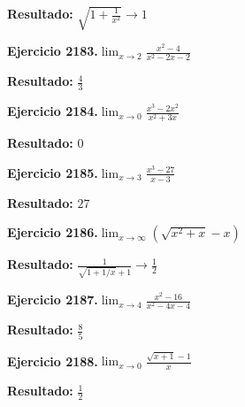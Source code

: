 \documentclass[10pt,a4paper]{article}
\begin{document}
\begin{solbox}
\textbf{Resultado:} \(\displaystyle \sqrt{1+\frac{1}{x^2}} \to 1\)
\end{solbox}

\newpage
\begin{ejbox}
\textbf{Ejercicio 2183.}\quad $\lim_{x\to 2} \frac{x^2-4}{x^2-2x-2}$
\end{ejbox}

\begin{solbox}
\textbf{Resultado:} \(\displaystyle \frac{4}{3}\)
\end{solbox}

\begin{ejbox}
\textbf{Ejercicio 2184.}\quad $\lim_{x\to 0} \frac{x^3-2x^2}{x^2+3x}$
\end{ejbox}

\begin{solbox}
\textbf{Resultado:} \(\displaystyle 0\)
\end{solbox}

\begin{ejbox}
\textbf{Ejercicio 2185.}\quad $\lim_{x\to 3} \frac{x^3-27}{x-3}$
\end{ejbox}

\begin{solbox}
\textbf{Resultado:} \(\displaystyle 27\)
\end{solbox}

\newpage
\begin{ejbox}
\textbf{Ejercicio 2186.}\quad $\lim_{x\to \infty} (\sqrt{x^2+x} - x)$
\end{ejbox}

\begin{solbox}
\textbf{Resultado:} \(\displaystyle \frac{1}{\sqrt{1+1/x}+1} \to \frac{1}{2}\)
\end{solbox}

\begin{ejbox}
\textbf{Ejercicio 2187.}\quad $\lim_{x\to 4} \frac{x^2-16}{x^2-4x-4}$
\end{ejbox}

\begin{solbox}
\textbf{Resultado:} \(\displaystyle \frac{8}{5}\)
\end{solbox}

\begin{ejbox}
\textbf{Ejercicio 2188.}\quad $\lim_{x\to 0} \frac{\sqrt{x+1}-1}{x}$
\end{ejbox}

\begin{solbox}
\textbf{Resultado:} \(\displaystyle \frac{1}{2}\)
\end{solbox}
\end{document}

